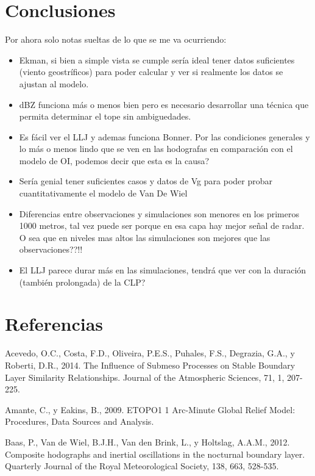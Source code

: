 \documentclass[12pt,spanish,oneside]{book}
\providecommand{\tightlist}{%
  \setlength{\itemsep}{0pt}\setlength{\parskip}{0pt}}
\begin{document}
\chapter{Conclusiones}\label{conclusiones}

Por ahora solo notas sueltas de lo que se me va ocurriendo:

\begin{itemize}
\tightlist
\item
  Ekman, si bien a simple vista se cumple sería ideal tener datos
  suficientes (viento geostríficos) para poder calcular y ver si
  realmente los datos se ajustan al modelo.
\item
  dBZ funciona más o menos bien pero es necesario desarrollar una
  técnica que permita determinar el tope sin ambiguedades.
\item
  Es fácil ver el LLJ y ademas funciona Bonner. Por las condiciones
  generales y lo más o menos lindo que se ven en las hodografas en
  comparación con el modelo de OI, podemos decir que esta es la causa?
\item
  Sería genial tener suficientes casos y datos de Vg para poder probar
  cuantitativamente el modelo de Van De Wiel
\item
  Diferencias entre observaciones y simulaciones son menores en los
  primeros 1000 metros, tal vez puede ser porque en esa capa hay mejor
  señal de radar. O sea que en niveles mas altos las simulaciones son
  mejores que las observaciones??!!
\item
  El LLJ parece durar más en las simulaciones, tendrá que ver con la
  duración (también prolongada) de la CLP?
\end{itemize}

\chapter*{Referencias}\label{referencias}

\hypertarget{refs}{}
\hypertarget{ref-Acevedo2014}{}
Acevedo, O.C., Costa, F.D., Oliveira, P.E.S., Puhales, F.S., Degrazia,
G.A., y Roberti, D.R., 2014. The Influence of Submeso Processes on
Stable Boundary Layer Similarity Relationships. Journal of the
Atmospheric Sciences, 71, 1, 207-225.

\hypertarget{ref-Amante2009}{}
Amante, C., y Eakins, B., 2009. ETOPO1 1 Arc-Minute Global Relief Model:
Procedures, Data Sources and Analysis.

\hypertarget{ref-Baas2012}{}
Baas, P., Van de Wiel, B.J.H., Van den Brink, L., y Holtslag, A.A.M.,
2012. Composite hodographs and inertial oscillations in the nocturnal
boundary layer. Quarterly Journal of the Royal Meteorological Society,
138, 663, 528-535.
\end{document}
